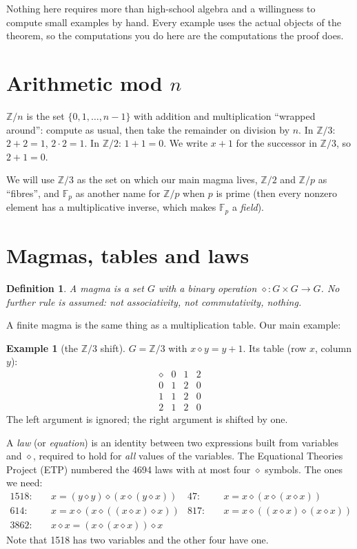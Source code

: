 \documentclass[11pt]{article}
\newtheorem{definition}{Definition}
\theoremstyle{definition}\newtheorem{example}{Example}\newtheorem{exercise}{Exercise}
\theoremstyle{remark}\newtheorem*{remark}{Remark}
\newcommand{\op}{\diamond}
\newcommand{\Z}{\mathbb{Z}}
\newcommand{\F}{\mathbb{F}}
\begin{document}
Nothing here requires more than high-school algebra and a willingness to compute small examples by hand. Every example uses the actual objects of the theorem, so the computations you do here are the computations the proof does.

\section{Arithmetic mod $n$}\label{sec:modn}

$\Z/n$ is the set $\{0,1,\dots,n-1\}$ with addition and multiplication ``wrapped around'': compute as usual, then take the remainder on division by $n$. In $\Z/3$: $2+2=1$, $2\cdot 2=1$. In $\Z/2$: $1+1=0$. We write $x+1$ for the successor in $\Z/3$, so $2+1=0$.

We will use $\Z/3$ as the set on which our main magma lives, $\Z/2$ and $\Z/p$ as ``fibres'', and $\F_p$ as another name for $\Z/p$ when $p$ is prime (then every nonzero element has a multiplicative inverse, which makes $\F_p$ a \emph{field}).

\section{Magmas, tables and laws}\label{sec:magma}

\begin{definition}
A \emph{magma} is a set $G$ with a binary operation $\op\colon G\times G\to G$. No further rule is assumed: not associativity, not commutativity, nothing.
\end{definition}

A finite magma is the same thing as a multiplication table. Our main example:

\begin{example}[the $\Z/3$ shift]\label{ex:shift}
$G=\Z/3$ with $x\op y = y+1$. Its table (row $x$, column $y$):
\[
\begin{array}{c|ccc}
\op & 0 & 1 & 2\\ \hline
0 & 1 & 2 & 0\\
1 & 1 & 2 & 0\\
2 & 1 & 2 & 0
\end{array}
\]
The left argument is ignored; the right argument is shifted by one.
\end{example}

A \emph{law} (or \emph{equation}) is an identity between two expressions built from variables and $\op$, required to hold for \emph{all} values of the variables. The Equational Theories Project (ETP) numbered the 4694 laws with at most four $\op$ symbols. The ones we need:
\begin{align*}
1518:&\quad x = (y \op y) \op (x \op (y \op x)) & 47:&\quad x = x \op (x \op (x \op x))\\
614:&\quad x = x \op (x \op ((x \op x) \op x)) & 817:&\quad x = x \op ((x \op x) \op (x \op x))\\
3862:&\quad x \op x = (x \op (x \op x)) \op x
\end{align*}
Note that 1518 has two variables and the other four have one.
\end{document}
